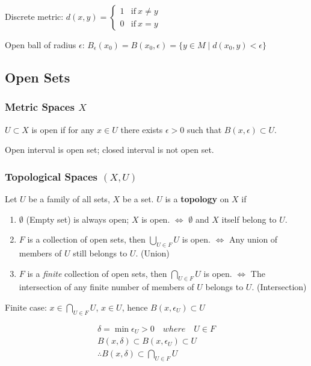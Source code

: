 \documentclass{article}
\begin{document}
        Discrete metric: $d(x, y) = \left\{\begin{matrix}
        1 &\mbox{if}\ x \neq y \\
        0 &\mbox{if}\ x = y 
        \end{matrix}\right.$

        Open ball of radius $\epsilon$:
        $B_{\epsilon}(x_{0}) = B(x_{0}, \epsilon) = \{ y \in M \mid d(x_{0}, y) < \epsilon \}$

    \subsection{Open Sets}

        \subsubsection{Metric Spaces $X$}

        $U \subset X$ is open if for any $x \in U$ there exists $\epsilon > 0$ such that $B(x, \epsilon) \subset U$.

        Open interval is open set; closed interval is not open set.

        \subsubsection{Topological Spaces $(X, U)$}

        Let $U$ be a family of all sets, $X$ be a set. $U$ is a \textbf{topology} on $X$ if

        \begin{enumerate}
            \item $\emptyset$ (Empty set) is always open; $X$ is open. $\Leftrightarrow$ $\emptyset$ and $X$ itself belong to $U$.
            \item $F$ is a collection of open sets, then $\bigcup_{U \in F} U$ is open. $\Leftrightarrow$ Any union of members of $U$ still belongs to $U$. (Union)
            \item $F$ is a \textit{finite} collection of open sets, then $\bigcap_{U \in F} U$ is open. $\Leftrightarrow$ The intersection of any finite number of members of $U$ belongs to $U$. (Intersection)
        \end{enumerate}

        Finite case: $x \in \bigcap_{U \in F} U$, $x \in U$, hence $B(x, \epsilon_{U}) \subset U$

        \begin{gather*}
            \delta = \min \epsilon_{U} > 0 \quad where \quad U \in F \\
            B(x, \delta) \subset B(x, \epsilon_{U}) \subset U \\
            \therefore B(x, \delta) \subset \bigcap_{U \in F} U
        \end{gather*}
\end{document}
